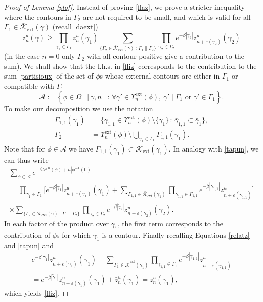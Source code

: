 \documentclass[JEP,XML,SOM,Unicode, NoFloatCountersInSection]{cedram}
\let\mathcal\mathscr
\newcommand{\sep}{\,:\,}
\numberwithin{equation}{section}
\theoremstyle{plain}
\theoremstyle{definition}
\newcommand{\ext}{\mathrm{ext}}
\newcommand{\cA}{{\ensuremath{\mathcal A}} }
\newcommand{\cH}{{\ensuremath{\mathcal H}} }
\newcommand{\cK}{{\ensuremath{\mathcal K}} }
\newcommand{\gb}{\beta}
\newcommand{\gep}{\varepsilon}
\newcommand{\gG}{\Gamma}
\newcommand{\gO}{\Omega}
\begin{document}
\begin{proof}[Proof of Lemma \ref{plof}]

Instead of proving \eqref{flaz}, we prove a stricter inequality where the contours in $\gG_2$ are not required to be small, and which is valid
for all $\gG_1\in \bar \cK_{\ext}(\gamma)$ (recall \eqref{daext})
\begin{equation}\label{fliz}
\bar z^{u}_{n}(\gamma)\ge \prod_{\gamma_1\in \gG_1} z^u_{n}(\gamma_1) \sum_{\{ \gG_2 \in \bar \cK_{\ext}(\gamma) \sep \gG_1 \parallel \gG_2\}}
\prod_{\gamma_2\in \gG_2 } e^{-\gb |\tilde\gamma_2|} z^u_{n+\gep(\gamma_2)}(\gamma_2)
\end{equation}
(in the case $n=0$ only $\gG_2$ with all contour positive give a contribution to the sum).
We shall show that the l.h.s. in \eqref{fliz} corresponds to the contribution to the sum \eqref{partisioux} of
the set of $\phi$s whose external contours are either in $\gG_1$ or compatible with $\gG_1$
\[
\cA:=\left\{ \phi\in \bar \gO^+[\gamma,n] \sep \forall \gamma' \in \Upsilon^{\ext}_n(\phi),\ \gamma' \mid \gG_1 \text{ or } \gamma'\in \gG_1\right\}.
\]
To make our decomposition we use the notation
\begin{equation*}\begin{split}
\gG_{1,1}(\gamma_1)&=\{ \gamma_{1,1}\in \Upsilon^{\ext}_n(\phi)\setminus \{\gamma_1\} \sep \bar \gamma_{1,1}\subset \bar \gamma_1\},\\
\gG_2&=\Upsilon^{\ext}_n(\phi) \setminus \bigcup_{\gamma_1\in \gG_1}\gG_{1,1}(\gamma_1).
\end{split}\end{equation*}
Note that for $\phi\in \cA$ we have $\gG_{1,1}(\gamma_1)\subset \bar \cK_{\ext}(\gamma_1)$.
In analogy with \eqref{tapun}, we can thus write
\begin{multline*}
\sum_{\phi\in \cA} e^{-\gb \cH^n(\phi)+h|\phi^{-1}(0)|}\\[-8pt]
=
\prod_{\gamma_1\in \gG_1}\biggl[ e^{-\gb|\tilde \gamma_{1}|} z^u_{n+\gep(\gamma_1)}(\gamma_1)+ \sum_{\gG_{1,1}\in \bar \cK_{\ext}(\gamma_1)}
\prod_{\gamma_{1,1}\in \gG_{1,1}} e^{-\gb|\tilde \gamma_{1,1}|}z^u_{n+\gep(\gamma_{1,1})} \biggr]\\
\times\sum_{\{ \gG_2 \in \bar\cK_{\ext}(\gamma) \sep \gG_1 \parallel \gG_2\}} \prod_{\gamma_2\in \gG_2 } e^{-\gb |\tilde\gamma_2|} z^u_{n+\gep(\gamma_2)}(\gamma_2).
\end{multline*}
In each factor of the product over $\gamma_1$, the first term corresponds to the contribution of $\phi$s
for which $\gamma_1$ is a contour.
Finally recalling Equations \eqref{relatz} and \eqref{tapun} and
\begin{multline*}
e^{-\gb|\tilde \gamma_{1}|} z^u_{n+\gep(\gamma_1)}(\gamma_1)+ \sum_{\gG_1\in\bar\cK^{\ext}(\gamma_1)} \prod_{\gamma_{1,1}\in \gG_1} e^{-\gb|\tilde \gamma_{1,1}|}
z^u_{n+\gep(\gamma_{1,1})}\\[-5pt]
=
e^{-\gb|\tilde \gamma_{1}|} z^u_{n+\gep(\gamma_1)}(\gamma_1)+ \bar z^u_n(\gamma_1)= z^{u}_n(\gamma_1),
\end{multline*}
which yields \eqref{fliz}.
\end{proof}
\end{document}
